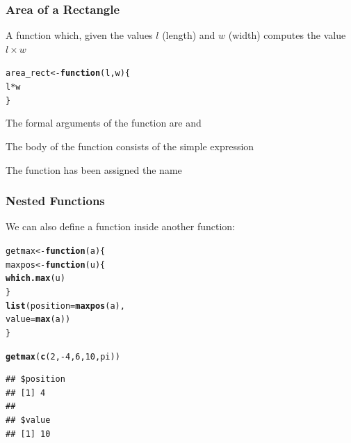 \documentclass[12pt]{beamer}\usepackage[]{graphicx}\usepackage[]{color}
\makeatletter
\newcommand{\hlnum}[1]{\textcolor[rgb]{0.686,0.059,0.569}{#1}}%
\newcommand{\hlopt}[1]{\textcolor[rgb]{0,0,0}{#1}}%
\newcommand{\hlstd}[1]{\textcolor[rgb]{0.345,0.345,0.345}{#1}}%
\newcommand{\hlkwa}[1]{\textcolor[rgb]{0.161,0.373,0.58}{\textbf{#1}}}%
\newcommand{\hlkwb}[1]{\textcolor[rgb]{0.69,0.353,0.396}{#1}}%
\newcommand{\hlkwc}[1]{\textcolor[rgb]{0.333,0.667,0.333}{#1}}%
\newcommand{\hlkwd}[1]{\textcolor[rgb]{0.737,0.353,0.396}{\textbf{#1}}}%
\newenvironment{kframe}{%
 \def\at@end@of@kframe{}%
 \ifinner\ifhmode%
  \def\at@end@of@kframe{\end{minipage}}%
  \begin{minipage}{\columnwidth}%
 \fi\fi%
 \def\FrameCommand##1{\hskip\@totalleftmargin \hskip-\fboxsep
 \colorbox{shadecolor}{##1}\hskip-\fboxsep
     \hskip-\linewidth \hskip-\@totalleftmargin \hskip\columnwidth}%
 \MakeFramed {\advance\hsize-\width
   \@totalleftmargin\z@ \linewidth\hsize
   \@setminipage}}%
 {\par\unskip\endMakeFramed%
 \at@end@of@kframe}
\newenvironment{knitrout}{}{} %
\makeatother
\begin{document}
\begin{frame}[fragile]
\frametitle{Area of a Rectangle}

A function which, given the values $l$ (length) and $w$ (width) computes the value $l \times w$
\begin{knitrout}\footnotesize
{}\color{fgcolor}\begin{kframe}
\begin{alltt}
\hlstd{area_rect} \hlkwb{<-} \hlkwa{function}\hlstd{(}\hlkwc{l}\hlstd{,} \hlkwc{w}\hlstd{) \{}
  \hlstd{l} \hlopt{*} \hlstd{w}
\hlstd{\}}
\end{alltt}
\end{kframe}
\end{knitrout}
\bi
  \item The formal arguments of the function are  and 
  \item The body of the function consists of the simple expression 
  \item The function has been assigned the name 
\ei

\end{frame}


\begin{frame}[fragile]
\frametitle{Nested Functions}

We can also define a function inside another function:
\begin{knitrout}\footnotesize
{}\color{fgcolor}\begin{kframe}
\begin{alltt}
\hlstd{getmax} \hlkwb{<-} \hlkwa{function}\hlstd{(}\hlkwc{a}\hlstd{) \{}
  \hlstd{maxpos} \hlkwb{<-} \hlkwa{function}\hlstd{(}\hlkwc{u}\hlstd{) \{}
    \hlkwd{which.max}\hlstd{(u)}
  \hlstd{\}}
  \hlkwd{list}\hlstd{(}\hlkwc{position} \hlstd{=} \hlkwd{maxpos}\hlstd{(a),}
       \hlkwc{value} \hlstd{=} \hlkwd{max}\hlstd{(a))}
\hlstd{\}}

\hlkwd{getmax}\hlstd{(}\hlkwd{c}\hlstd{(}\hlnum{2}\hlstd{,} \hlopt{-}\hlnum{4}\hlstd{,} \hlnum{6}\hlstd{,} \hlnum{10}\hlstd{, pi))}
\end{alltt}
\begin{verbatim}
## $position
## [1] 4
## 
## $value
## [1] 10
\end{verbatim}
\end{kframe}
\end{knitrout}

\end{frame}
\end{document}
